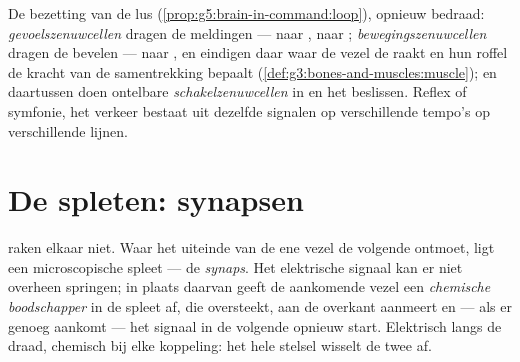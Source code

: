\begin{example}\label{ex:g8:nervous-communication:lines}
De bezetting van de lus (\cref{prop:g5:brain-in-command:loop}), opnieuw
bedraad: \emph{gevoelszenuwcellen} dragen de meldingen ---  naar
,  naar ; \emph{bewegingszenuwcellen} dragen de
bevelen ---  naar , en eindigen daar waar de vezel de 
raakt en hun roffel de kracht van de samentrekking bepaalt
(\cref{def:g3:bones-and-muscles:muscle}); en daartussen doen ontelbare
\emph{schakelzenuwcellen} in  en  het beslissen. Reflex
of symfonie, het verkeer bestaat uit dezelfde signalen op verschillende
tempo's op verschillende lijnen.
\end{example}

\section{De spleten: synapsen}

\begin{definition}[De synaps]\label{def:g8:nervous-communication:synapse}
 raken elkaar niet. Waar het uiteinde van de ene vezel de
volgende  ontmoet, ligt een microscopische spleet --- de
\emph{synaps}. Het elektrische signaal kan er niet
overheen springen; in plaats daarvan geeft de aankomende vezel een
\emph{chemische boodschapper} in de spleet af, die oversteekt, aan de
overkant aanmeert en --- als er genoeg aankomt --- het signaal in de
volgende  opnieuw start. Elektrisch langs de draad, chemisch bij
elke koppeling: het hele stelsel wisselt de twee af.
\end{definition}

